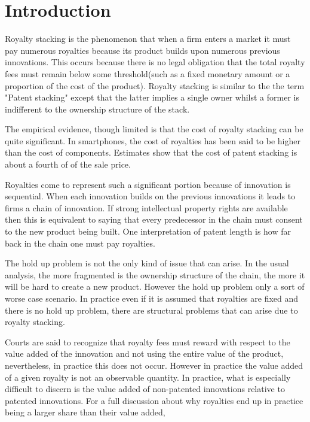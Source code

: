 \documentclass{article}
\begin{document}
\section{Introduction}

Royalty stacking is the phenomenon that when a firm enters a market it must pay numerous royalties because its product builds upon numerous previous innovations. This occurs because there is no legal obligation that the total royalty fees must remain below some threshold(such as a fixed monetary amount or a proportion of the cost of the product). Royalty stacking is similar to the the term "Patent stacking" except that the latter implies a single owner whilst a former is indifferent to the ownership structure of the stack. 

The empirical evidence, though limited is that the cost of royalty stacking can be quite significant. In smartphones, the cost of royalties has been said to be higher than the cost of components. Estimates show that the cost of patent stacking is about a fourth of of the sale price. \cite{Armstrong2014}

Royalties come to represent such a significant portion because of innovation is sequential. When each innovation builds on the previous innovations it leads to firms a chain of innovation. If strong intellectual property rights are available then this is equivalent to saying that every predecessor in the chain must consent to the new product being built. One interpretation of patent length is how far back in the chain one must pay royalties. 

The hold up problem is not the only kind of issue that can arise. In the usual analysis, the more fragmented is the ownership structure of the chain, the more it will be hard to create a new product. However the hold up problem only a sort of worse case scenario. In practice even if it is assumed that royalties are fixed and there is no hold up problem, there are structural problems that can arise due to royalty stacking. 

Courts are said to recognize that royalty fees must reward with respect to the value added of the innovation and not using the entire value of the product, nevertheless, in practice this does not occur. However in practice the value added of a given royalty is not an observable quantity. In practice, what is especially difficult to discern is the value added of non-patented innovations relative to patented innovations. For a full discussion about why royalties end up in practice being a larger share than their value added, \cite{Elhauge2008}
\end{document}
